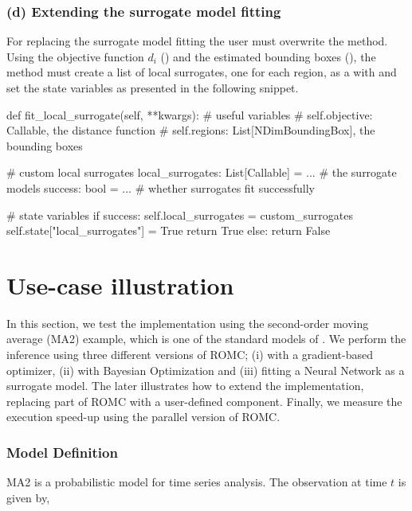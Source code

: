 \documentclass[article, shortnames]{jss}
\begin{document}
\subsubsection*{(d) Extending the surrogate model fitting}

For replacing the surrogate model fitting the user must overwrite the
 method. Using the objective function
\(d_i\) () and the estimated bounding boxes
(), the method must create a list of local
surrogates, one for each region, as a  with
 and set the state variables as presented in the
following snippet.

\begin{Code}
def fit_local_surrogate(self, **kwargs):
    # useful variables
    # self.objective: Callable, the distance function
    # self.regions: List[NDimBoundingBox], the bounding boxes

    # custom local surrogates
    local_surrogates: List[Callable] = ... # the surrogate models
    success: bool = ... # whether surrogates fit successfully

    # state variables
    if success:
        self.local_surrogates = custom_surrogates
        self.state["local_surrogates"] = True
        return True
    else:
        return False
\end{Code}


\section{Use-case illustration}

In this section, we test the implementation using the second-order
moving average (MA2) example, which is one of the standard models of
. We perform the inference using three different versions of
ROMC; (i) with a gradient-based optimizer, (ii) with Bayesian
Optimization and (iii) fitting a Neural Network as a surrogate
model. The later illustrates how to extend the implementation,
replacing part of ROMC with a user-defined component. Finally, we
measure the execution speed-up using the parallel version of ROMC.

\subsubsection*{Model Definition}

MA2 is a probabilistic model for time series analysis. The observation
at time \(t\) is given by,
\end{document}
